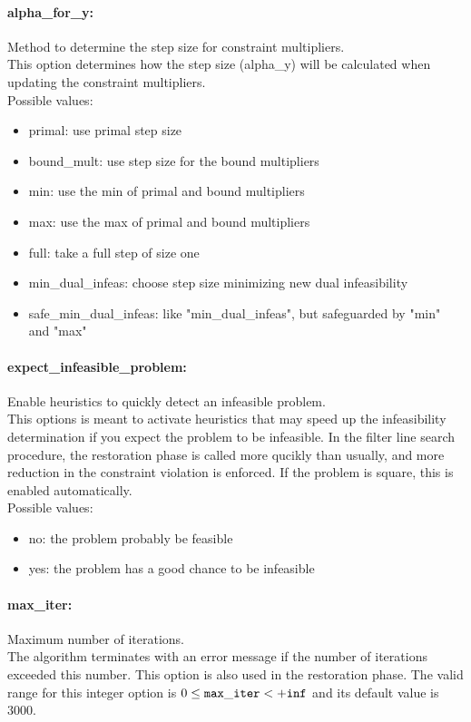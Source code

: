 \documentclass[letter,10pt]{article}
\begin{document}
\paragraph{alpha\_for\_y:} Method to determine the step size for constraint multipliers. $\;$ \\
 This option determines how the step size
(alpha\_y) will be calculated when updating the
constraint multipliers.\\ 
Possible values:
\begin{itemize}
   \item primal: use primal step size
   \item bound\_mult: use step size for the bound multipliers
   \item min: use the min of primal and bound multipliers
   \item max: use the max of primal and bound multipliers
   \item full: take a full step of size one
   \item min\_dual\_infeas: choose step size minimizing new dual
infeasibility
   \item safe\_min\_dual\_infeas: like "min\_dual\_infeas", but safeguarded by
"min" and "max"
\end{itemize}

\paragraph{expect\_infeasible\_problem:} Enable heuristics to quickly detect an infeasible problem. $\;$ \\
 This options is meant to activate heuristics that
may speed up the infeasibility determination if
you expect the problem to be infeasible.  In the
filter line search procedure, the restoration
phase is called more qucikly than usually, and
more reduction in the constraint violation is
enforced. If the problem is square, this is
enabled automatically.\\ 
Possible values:
\begin{itemize}
   \item no: the problem probably be feasible
   \item yes: the problem has a good chance to be infeasible
\end{itemize}

\paragraph{max\_iter:} Maximum number of iterations. $\;$ \\
 The algorithm terminates with an error message if
the number of iterations exceeded this number.
This option is also used in the restoration phase. The valid range for this integer option is
$0 \le {\tt max\_iter } <  {\tt +inf}$
and its default value is $3000$.
\end{document}

